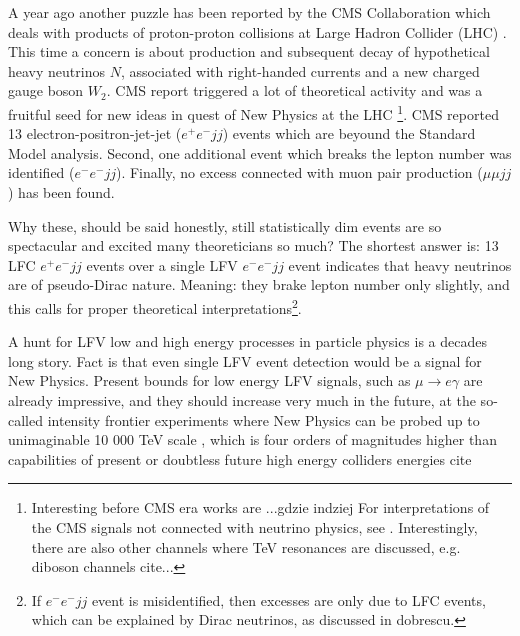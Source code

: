 \documentclass[twocolumn,superscriptaddress,showpacs,prl,nofootinbib,floatfix]{revtex4}
\begin{document}
A year ago  another puzzle has been reported by the CMS Collaboration  which deals with products of proton-proton collisions at Large Hadron Collider (LHC) \cite{Khachatryan:2014dka}.  This time a concern is about  production and subsequent decay of hypothetical  heavy neutrinos $N$,  associated with right-handed currents and a new charged gauge boson $W_2$. CMS report triggered a lot of theoretical activity
and  was a fruitful seed for new ideas in quest of New Physics at the LHC  \cite{Deppisch:2014qpa,Heikinheimo:2014tba, Deppisch:2014zta,Aguilar-Saavedra:2014ola, Ng:2015hba,Dobrescu:2015qna,Brehmer:2015cia,Dev:2015pga,Coloma:2015una,Gluza:2015goa,
Das:2014jxa} \footnote{Interesting before CMS era works are \cite{Han:2012vk, Atre:2009rg}...gdzie indziej For  interpretations of the CMS signals not connected with neutrino physics, see \cite{Berger:2015qra,Krauss:2015nba,Dhuria:2015swa}. Interestingly, there are also other channels where TeV resonances are discussed, e.g. diboson channels cite...}. 
CMS reported 13 electron-positron-jet-jet ($e^+e^-jj$) events which are beyound the Standard Model analysis. Second, one additional event which breaks the lepton number was identified ($e^-e^-jj$). Finally, no excess connected with muon pair production ($\mu \mu jj$) has been found. 

Why these, should be said honestly, still statistically dim events are so spectacular and excited many theoreticians so much? The shortest answer is: 13 LFC $e^+e^-jj$ events over a single LFV  $e^-e^-jj$ event indicates that heavy neutrinos are of pseudo-Dirac nature. Meaning: they brake lepton number only slightly, and this calls for proper theoretical interpretations\footnote{If $e^-e^-jj$ event is misidentified, then excesses are only due to LFC events, which can be explained by Dirac neutrinos, as discussed in dobrescu.}.  

A hunt for LFV low and high energy processes in particle physics is a decades long story. Fact is that even single LFV event detection  would be a signal for New Physics. Present bounds for low energy LFV signals, such as 
$\mu \to e \gamma$  are already impressive, and they should increase very much in the future, at the so-called intensity frontier experiments where
New Physics can be probed up to unimaginable 10 000 TeV scale
\cite{Kuno:2013mha, Brown:2015cka}, which is four orders of magnitudes higher  than capabilities of present or doubtless future high energy colliders energies cite 
 
\end{document}
